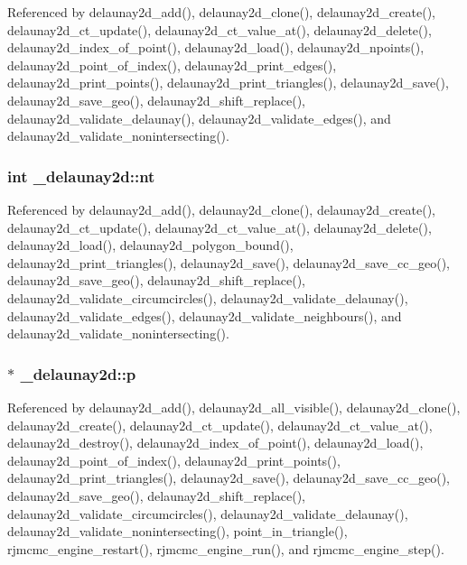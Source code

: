 Referenced by delaunay2d\+\_\+add(), delaunay2d\+\_\+clone(), delaunay2d\+\_\+create(), delaunay2d\+\_\+ct\+\_\+update(), delaunay2d\+\_\+ct\+\_\+value\+\_\+at(), delaunay2d\+\_\+delete(), delaunay2d\+\_\+index\+\_\+of\+\_\+point(), delaunay2d\+\_\+load(), delaunay2d\+\_\+npoints(), delaunay2d\+\_\+point\+\_\+of\+\_\+index(), delaunay2d\+\_\+print\+\_\+edges(), delaunay2d\+\_\+print\+\_\+points(), delaunay2d\+\_\+print\+\_\+triangles(), delaunay2d\+\_\+save(), delaunay2d\+\_\+save\+\_\+geo(), delaunay2d\+\_\+shift\+\_\+replace(), delaunay2d\+\_\+validate\+\_\+delaunay(), delaunay2d\+\_\+validate\+\_\+edges(), and delaunay2d\+\_\+validate\+\_\+nonintersecting().

\subsubsection[{\texorpdfstring{nt}{nt}}]{\setlength{\rightskip}{0pt plus 5cm}int \+\_\+delaunay2d\+::nt}\hypertarget{struct__delaunay2d_a04dd3e53c2c24c4e1240f498951460bc}{}\label{struct__delaunay2d_a04dd3e53c2c24c4e1240f498951460bc}


Referenced by delaunay2d\+\_\+add(), delaunay2d\+\_\+clone(), delaunay2d\+\_\+create(), delaunay2d\+\_\+ct\+\_\+update(), delaunay2d\+\_\+ct\+\_\+value\+\_\+at(), delaunay2d\+\_\+delete(), delaunay2d\+\_\+load(), delaunay2d\+\_\+polygon\+\_\+bound(), delaunay2d\+\_\+print\+\_\+triangles(), delaunay2d\+\_\+save(), delaunay2d\+\_\+save\+\_\+cc\+\_\+geo(), delaunay2d\+\_\+save\+\_\+geo(), delaunay2d\+\_\+shift\+\_\+replace(), delaunay2d\+\_\+validate\+\_\+circumcircles(), delaunay2d\+\_\+validate\+\_\+delaunay(), delaunay2d\+\_\+validate\+\_\+edges(), delaunay2d\+\_\+validate\+\_\+neighbours(), and delaunay2d\+\_\+validate\+\_\+nonintersecting().

\subsubsection[{\texorpdfstring{p}{p}}]{$\ast$ \+\_\+delaunay2d\+::p}\hypertarget{struct__delaunay2d_af57685b4023a92bf3135552ed0ee62b7}{}\label{struct__delaunay2d_af57685b4023a92bf3135552ed0ee62b7}


Referenced by delaunay2d\+\_\+add(), delaunay2d\+\_\+all\+\_\+visible(), delaunay2d\+\_\+clone(), delaunay2d\+\_\+create(), delaunay2d\+\_\+ct\+\_\+update(), delaunay2d\+\_\+ct\+\_\+value\+\_\+at(), delaunay2d\+\_\+destroy(), delaunay2d\+\_\+index\+\_\+of\+\_\+point(), delaunay2d\+\_\+load(), delaunay2d\+\_\+point\+\_\+of\+\_\+index(), delaunay2d\+\_\+print\+\_\+points(), delaunay2d\+\_\+print\+\_\+triangles(), delaunay2d\+\_\+save(), delaunay2d\+\_\+save\+\_\+cc\+\_\+geo(), delaunay2d\+\_\+save\+\_\+geo(), delaunay2d\+\_\+shift\+\_\+replace(), delaunay2d\+\_\+validate\+\_\+circumcircles(), delaunay2d\+\_\+validate\+\_\+delaunay(), delaunay2d\+\_\+validate\+\_\+nonintersecting(), point\+\_\+in\+\_\+triangle(), rjmcmc\+\_\+engine\+\_\+restart(), rjmcmc\+\_\+engine\+\_\+run(), and rjmcmc\+\_\+engine\+\_\+step().

